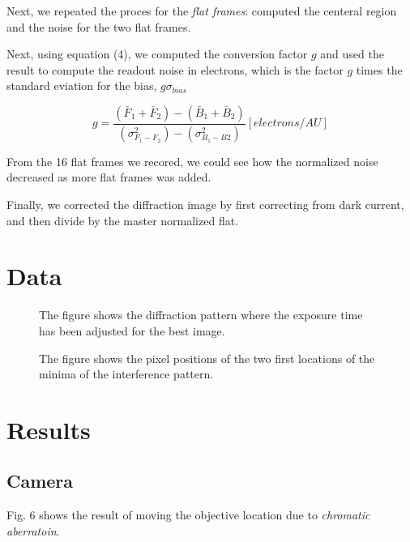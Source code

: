 \documentclass{emulateapj}
\begin{document}
  Next, we repeated the proces for the \textit{flat frames}: computed the centeral region and the noise for the two flat frames.

  Next, using equation (4), we computed the conversion factor $g$ and used the result to compute the readout noise in electrons, which is the factor $g$ times the standard eviation for the bias, $g\sigma_{bias}$

\begin{equation}
g = \frac{(\bar{F}_1 + \bar{F}_2) - (\bar{B}_1 + \bar{B}_2)}{(\sigma_{F_1-F_2}^2) - (\sigma_{B_1-B2}^2)}[electrons/AU]
\end{equation}

  From the 16 flat frames we recored, we could see how the normalized noise decreased as more flat frames was added.

  Finally, we corrected the diffraction image by first correcting from dark current, and then divide by the master normalized flat.


\section{Data}
\label{sec:data}

\begin{figure}[H]
\mbox{}
\caption{The figure shows the diffraction pattern where the exposure time has been adjusted for the best image.}
\label{fig:figure_interference_1}
\end{figure}

\begin{figure}[H]
\mbox{}
\caption{The figure shows the pixel positions of the two first locations of the minima of the interference pattern.}
\label{fig:figure_interference_plot}
\end{figure}

\section{Results}
\label{sec:results}

\subsection{Camera}

Fig. 6 shows the result of moving the objective location due to \textit{chromatic aberratoin}.
\end{document}
